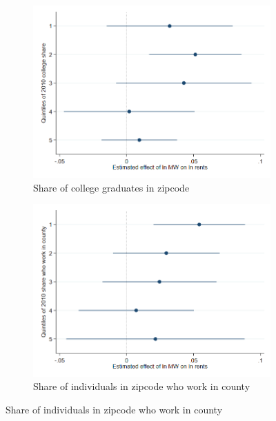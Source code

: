 \clearpage
\begin{figure}[htb] \centering
    \caption{Heterogeneity of effect - first difference model}
    \label{appfig:fd_heterogeneity_appendix}
    \begin{subfigure}{0.5\textwidth} \centering
        \includegraphics[width=0.99\linewidth]{analysis/first_differences/output/fd_static_heter_college_share20105.png}
        \caption{Share of college graduates in zipcode} \label{appfig:fd_heterogeneity_college_share}
    \end{subfigure}%
    \begin{subfigure}{0.5\textwidth} \centering
        \includegraphics[width=0.99\linewidth]{analysis/first_differences/output/fd_static_heter_work_county_share20105.png}
        \caption{Share of individuals in zipcode who work in county} \label{appfig:fd_heterogeneity_work_county}

\end{subfigure}
\end{figure}
